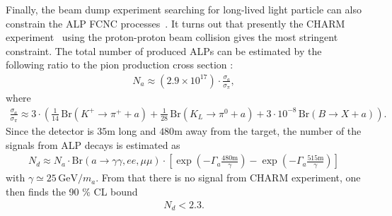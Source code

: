 \documentclass[preprint,prd,aps,tighten,nofootinbib,amssymb]{revtex4}
\newcommand{\bea}{\begin{eqnarray}}
\newcommand{\eea}{\end{eqnarray}}
\newcommand{\dis}[1]{\begin{equation}\begin{split}#1\end{split}\end{equation}}
\begin{document}
Finally, the beam dump experiment searching for long-lived light particle can also constrain the ALP FCNC processes~\cite{Dobrich:2015jyk,Bezrukov:2009yw}.
It turns out that presently the CHARM experiment~\cite{Bergsma:1985qz}
using the proton-proton beam collision
gives the most stringent constraint.
The total number of produced ALPs can be estimated by the following ratio to the pion production cross section \cite{Bezrukov:2009yw, Clarke:2013aya}: 
\bea
N_a \approx \left(2.9 \times 10^{17}\right) \cdot \frac{\sigma_a}{\sigma_\pi},
\eea
where
\dis{
\frac{\sigma_a}{\sigma_\pi} \approx 3 \cdot \left( \frac{1}{14}\,\text{Br}\left(K^+\rightarrow \pi^+ + a\right) +  \frac{1}{28}\,\text{Br}\left(K_L\rightarrow \pi^0 + a\right) +  3\cdot 10^{-8}\,\text{Br}\left(B\rightarrow X + a\right)\right).\nonumber
}
Since the detector is $35 \mathrm{m}$ long and $480 \mathrm{m}$ away from the target, the number of the signals from ALP decays is estimated as
\bea
N_d \approx N_a \cdot \text{Br}\left(a \rightarrow \gamma\gamma, ee, \mu\mu\right)\cdot \left[\exp\left(-\Gamma_a\frac{480\mathrm{m}}{\gamma}\right)-\exp\left(-\Gamma_a\frac{515\mathrm{m}}{\gamma}\right)\right] 
\eea
with $\gamma \simeq 25\,\mathrm{GeV}/m_a$.
From that there is no signal from CHARM experiment, one then finds the 90 $\%$ CL bound \cite{Clarke:2013aya}\bea
N_d < 2.3.\eea
\end{document}
